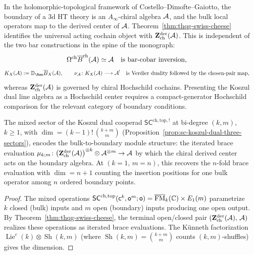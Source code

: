 \begin{remark}
\label{rem:thqg-oc-physical}
In the holomorphic-topological framework of
Costello--Dimofte--Gaiotto, the boundary of a 3d HT theory is an
$A_\infty$-chiral algebra $\mathcal{A}$, and the bulk local operators map to
the derived center of $\mathcal{A}$. Theorem~\ref{thm:thqg-swiss-cheese}
identifies the universal acting cochain object with
$\mathbf{Z}^{\mathrm{der}}_{\mathrm{ch}}(\mathcal{A})$.
This is independent of the two bar constructions in the spine of
the monograph:
\[
\Omega^{\mathrm{ch}}\overline{B}^{\mathrm{ch}}(\mathcal{A})\simeq \mathcal{A}
\quad\text{is bar-cobar inversion,}
\]
\[
K_X(\cA):=\mathbb{D}_{\Ran}\barB_X(\cA),\qquad
\nu_{\cA}\colon K_X(\cA)\longrightarrow\cA^!
\quad\text{is Verdier duality followed by the chosen-pair map,}
\]
whereas
$\mathbf{Z}^{\mathrm{der}}_{\mathrm{ch}}(\mathcal{A})$ is governed by
chiral Hochschild cochains. Presenting the Koszul dual line algebra
as a Hochschild center requires a compact-generator Hochschild
comparison for the relevant category of boundary conditions.
\end{remark}

\begin{proposition}
\label{prop:mixed-sector-bulk-boundary}
The mixed sector of the Koszul dual cooperad
$\mathsf{SC}^{\mathrm{ch,top},!}$ at bi-degree $(k,m)$,
$k \geq 1$, with
$\dim = (k{-}1)!\,\binom{k+m}{m}$
\textup{(}Proposition~\textup{\ref{prop:sc-koszul-dual-three-sectors}}\textup{)},
encodes the bulk-to-boundary module structure: the iterated
brace evaluation
$\mu_{k;m}\colon
\bigl(\mathbf{Z}^{\mathrm{der}}_{\mathrm{ch}}(\mathcal{A})\bigr)^{\otimes k}
\otimes \mathcal{A}^{\otimes m} \to \mathcal{A}$
by which the chiral derived center acts on the boundary algebra.
At $(k{=}1,\,m{=}n)$, this recovers the $n$-fold brace
evaluation with $\dim = n{+}1$ counting the insertion positions
for one bulk operator among $n$ ordered boundary points.
\end{proposition}

\begin{proof}
The mixed operations
$\mathsf{SC}^{\mathrm{ch,top}}(\mathsf{c}^k,\mathsf{o}^m;\mathsf{o})
= \overline{\operatorname{FM}}_k(\mathbb{C}) \times E_1(m)$
parametrize $k$ closed (bulk) inputs and $m$ open (boundary)
inputs producing one open output. By
Theorem~\ref{thm:thqg-swiss-cheese}, the terminal open/closed
pair
$(\mathbf{Z}^{\mathrm{der}}_{\mathrm{ch}}(\mathcal{A}),\,\mathcal{A})$
realizes these operations as iterated brace evaluations. The
K\"unneth factorization
$\operatorname{Lie}^c(k) \otimes \operatorname{Sh}(k,m)$
(where $\operatorname{Sh}(k,m) = \binom{k+m}{m}$ counts
$(k,m)$-shuffles) gives the dimension.
\end{proof}

